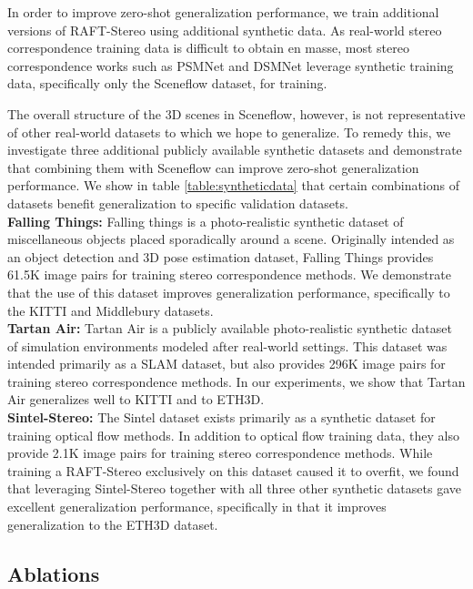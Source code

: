 \documentclass[10pt,twocolumn,letterpaper]{article}
\begin{document}
In order to improve zero-shot generalization performance, we train additional versions of RAFT-Stereo using additional synthetic data. As real-world stereo correspondence training data is difficult to obtain en masse, most stereo correspondence works such as PSMNet \cite{psmnet} and DSMNet \cite{dsmnet} leverage synthetic training data, specifically only the Sceneflow dataset, for training.

The overall structure of the 3D scenes in Sceneflow, however, is not representative of other real-world datasets to which we hope to generalize. To remedy this, we investigate three additional publicly available synthetic datasets and demonstrate that combining them with Sceneflow can improve zero-shot generalization performance. We show in table \ref{table:syntheticdata} that certain combinations of datasets benefit generalization to specific validation datasets. \smallskip\\ 
\noindent\textbf{Falling Things:} Falling things \cite{DBLP:journals/corr/abs-1804-06534} is a photo-realistic synthetic dataset of miscellaneous objects placed sporadically around a scene. Originally intended as an object detection and 3D pose estimation dataset, Falling Things provides 61.5K image pairs for training stereo correspondence methods. We demonstrate that the use of this dataset improves generalization performance, specifically to the KITTI and Middlebury datasets.\smallskip\\
\noindent\textbf{Tartan Air:} Tartan Air \cite{tartanair2020iros} is a publicly available photo-realistic synthetic dataset of simulation environments modeled after real-world settings. This dataset was intended primarily as a SLAM dataset, but also provides 296K image pairs for training stereo correspondence methods. In our experiments, we show that Tartan Air generalizes well to KITTI and to ETH3D. \smallskip\\
\noindent\textbf{Sintel-Stereo:} The Sintel dataset \cite{Butler:ECCV:2012} exists primarily as a synthetic dataset for training optical flow methods. In addition to optical flow training data, they also provide 2.1K image pairs for training stereo correspondence methods. While training a RAFT-Stereo exclusively on this dataset caused it to overfit, we found that leveraging Sintel-Stereo together with all three other synthetic datasets gave excellent generalization performance, specifically in that it improves generalization to the ETH3D dataset.

\subsection{Ablations}
\label{sec:ablations}
\end{document}
